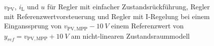 \begin{figure}[H]
    \centering
    \caption[Reglervergleich für das nicht-lineare Zustandsraummodell]{$v_{\mathrm{PV}}$, $i_{\mathrm{L}}$ und $u$ für Regler mit einfacher Zustandsrückführung, Regler mit Referenzwertvorsteuerung und Regler mit I-Regelung bei einem Einganssprung von $v_{\mathrm{PV,MPP}} - \SI{10}{V}$ \bzw einem Referenzwert von $y_{ref} = v_{\mathrm{PV,MPP}} + \SI{10}{V}$ am nicht-linearen Zustandsraummodell}
    \label{fig:Bild26}
\end{figure}